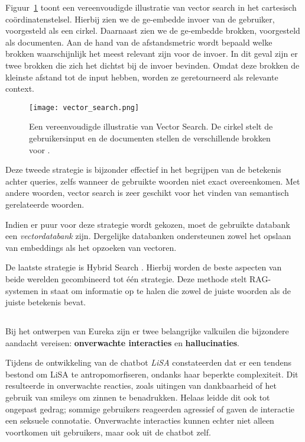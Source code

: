 Figuur~\ref{fig:vector_search} toont een vereenvoudigde illustratie van vector search in het cartesisch coördinatenstelsel. Hierbij zien we de ge-embedde invoer van de gebruiker, voorgesteld als een cirkel. Daarnaast zien we de ge-embedde brokken, voorgesteld als documenten. Aan de hand van de afstandsmetric wordt bepaald welke brokken waarschijnlijk het meest relevant zijn voor de invoer. In dit geval zijn er twee brokken die zich het dichtst bij de invoer bevinden. Omdat deze brokken de kleinste afstand tot de input hebben, worden ze geretourneerd als relevante context.

\begin{figure}
    \centering
    \texttt{[image: vector\_search.png]}
    \caption[Vulgarisatie van Embbe Search in het cartesisch coördinatenstelsel]{\label{fig:vector_search}Een vereenvoudigde illustratie van Vector Search. De cirkel stelt de gebruikersinput en de documenten stellen de verschillende brokken voor \autocite{Vespa2023}.}
\end{figure}
        
Deze tweede strategie is bijzonder effectief in het begrijpen van de betekenis achter queries, zelfs wanneer de gebruikte woorden niet exact overeenkomen. Met andere woorden, vector search is zeer geschikt voor het vinden van semantisch gerelateerde woorden.

Indien er puur voor deze strategie wordt gekozen, moet de gebruikte databank een \emph{vectordatabank} zijn. Dergelijke databanken ondersteunen zowel het opslaan van embeddings als het opzoeken van vectoren.

De laatste strategie is Hybrid Search \autocite{Bansal2023}. Hierbij worden de beste aspecten van beide werelden gecombineerd tot één strategie. Deze methode stelt RAG-systemen in staat om informatie op te halen die zowel de juiste woorden als de juiste betekenis bevat. 

\subsection{}%
\label{subsec:valkuilen}

Bij het ontwerpen van Eureka zijn er twee belangrijke valkuilen die bijzondere aandacht vereisen: \textbf{onverwachte interacties} en \textbf{hallucinaties}.

Tijdens de ontwikkeling van de chatbot \emph{LiSA} constateerden \textcite{Dibitonto2018} dat er een tendens bestond om LiSA te antropomorfiseren, ondanks haar beperkte complexiteit. Dit resulteerde in onverwachte reacties, zoals uitingen van dankbaarheid of het gebruik van smileys om zinnen te benadrukken. Helaas leidde dit ook tot ongepast gedrag; sommige gebruikers reageerden agressief of gaven de interactie een seksuele connotatie. Onverwachte interacties kunnen echter niet alleen voortkomen uit gebruikers, maar ook uit de chatbot zelf.

